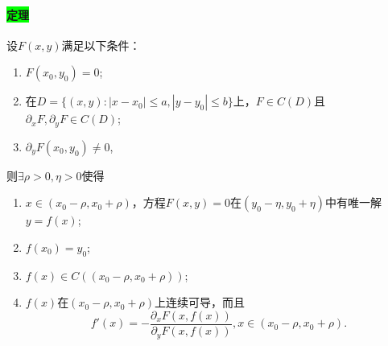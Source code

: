 \documentclass[UTF8]{ctexart}
\begin{document}
        \paragraph{\colorbox{lime}{定理}}设$F(x,y)$满足以下条件：
            \begin{enumerate}[(1)]
                \item  $F(x_0,y_0)=0$;
                \item 在$D=\{(x,y):|x-x_0|\le a,|y-y_0|\le b\}$上，$F\in C(D)$且$\partial_xF,\partial_yF\in C(D)$;
                \item $\partial_yF(x_0,y_0)\not =0$,
            \end{enumerate}
        则$\exists\rho>0,\eta>0$使得
        \begin{enumerate}[(1)]
            \item $x\in(x_0-\rho,x_0+\rho)$，方程$F(x,y)=0$在$(y_0-\eta,y_0+\eta)$中有唯一解$y=f(x)$;
            \item $f(x_0)=y_0$;
            \item $f(x)\in C((x_0-\rho,x_0+\rho))$;
            \item $f(x)$在$(x_0-\rho,x_0+\rho)$上连续可导，而且$$f'(x)=-\frac{\partial_xF(x,f(x))}{\partial_yF(x,f(x))},x\in (x_0-\rho,x_0+\rho).$$
        \end{enumerate}
\end{document}
